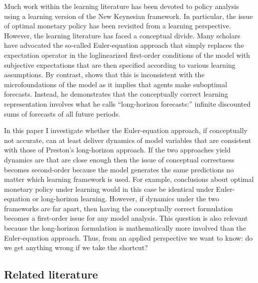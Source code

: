 \documentclass[11pt]{article}
\renewcommand{\[}{\begin{equation}}
\renewcommand{\]}{\end{equation}}
\begin{document}
Much work within the learning literature has been devoted to policy analysis using a learning version of the New Keynesian framework. In particular, the issue of optimal monetary policy has been revisited from a learning perspective. However, the learning literature has faced a conceptual divide. Many scholars have advocated the so-called Euler-equation approach that simply replaces the expectation operator in the loglinearized first-order conditions of the model with subjective expectations that are then specified according to various learning assumptions. By contrast, \cite{preston2005} shows that this is inconsistent with the microfoundations of the model as it implies that agents make suboptimal forecasts. Instead, he demonstrates that the conceptually correct learning representation involves what he calls ``long-horizon forecasts:'' infinite discounted sums of forecasts of all future periods. 

In this paper I investigate whether the Euler-equation approach, if conceptually not accurate, can at least deliver dynamics of model variables that are consistent with those of Preston's long-horizon approach. If the two approaches yield dynamics are that are close enough then the issue of conceptual correctness becomes second-order because the model generates the same predictions no matter which learning framework is used. For example, conclusions about optimal monetary policy under learning would in this case be identical under Euler-equation or long-horizon learning. However, if dynamics under the two frameworks are far apart, then having the conceptually correct formulation becomes a first-order issue for any model analysis. This question is also relevant because the long-horizon formulation is mathematically more involved than the Euler-equation approach. Thus, from an applied perspective we want to know: do we get anything wrong if we take the shortcut?

\subsection{Related literature}
\end{document}
